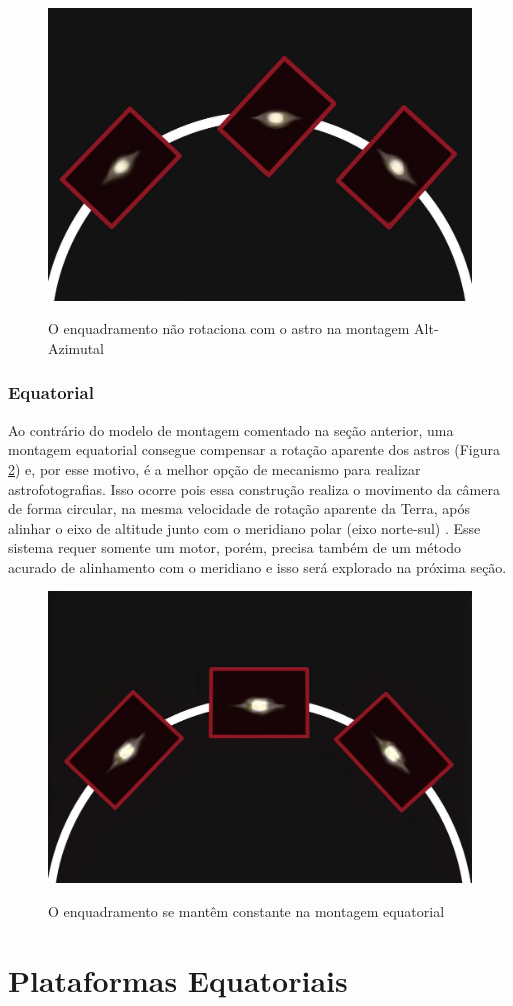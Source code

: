 \begin{figure}[!htb]
	\centering
	\caption{O enquadramento não rotaciona com o astro na montagem Alt-Azimutal}
	\includegraphics[width=0.45\linewidth]{figuras/revisaobiblio/altazimuterotation}
	\label{fig:altazimuterotation}
\end{figure}


\subsubsection{Equatorial}

Ao contrário do modelo de montagem comentado na seção anterior, uma montagem equatorial consegue compensar a rotação aparente dos astros (Figura \ref{fig:equatorialrotation}) e, por esse motivo, é a melhor opção de mecanismo para realizar astrofotografias. Isso ocorre pois essa construção realiza o movimento da câmera de forma circular, na mesma velocidade de rotação aparente da Terra, após alinhar o eixo de altitude junto com o meridiano polar (eixo norte-sul) \cite{book:bbcsky}. Esse sistema requer somente um motor, porém, precisa também de um método acurado de alinhamento com o meridiano e isso será explorado na próxima seção. 

\begin{figure}[!htb]
	\centering
	\caption{O enquadramento se mantêm constante na montagem equatorial}
	\includegraphics[width=0.45\linewidth]{figuras/revisaobiblio/equatorialrotation}
	\label{fig:equatorialrotation}
\end{figure}

\section{Plataformas Equatoriais}

